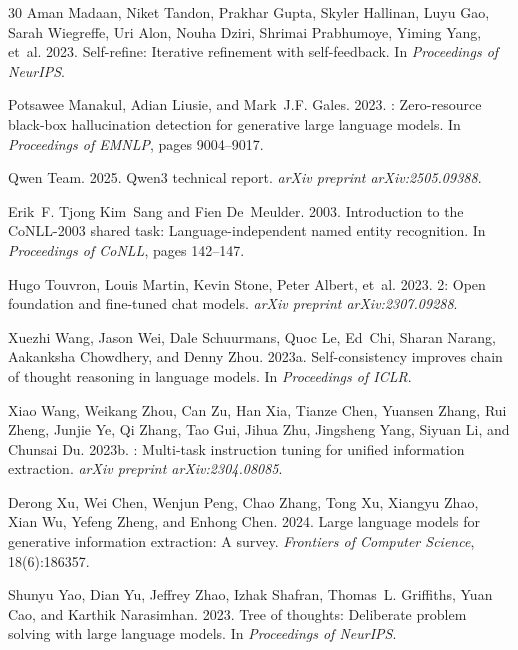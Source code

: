 \documentclass[11pt,a4paper]{article}
\begin{document}
\begin{thebibliography}{30}
Aman Madaan, Niket Tandon, Prakhar Gupta, Skyler Hallinan, Luyu Gao, Sarah Wiegreffe, Uri Alon, Nouha Dziri, Shrimai Prabhumoye, Yiming Yang, et~al. 2023.
\newblock Self-refine: Iterative refinement with self-feedback.
\newblock In \emph{Proceedings of NeurIPS}.

Potsawee Manakul, Adian Liusie, and Mark~J.F. Gales. 2023.
: Zero-resource black-box hallucination detection for generative large language models.
\newblock In \emph{Proceedings of EMNLP}, pages 9004--9017.

Qwen Team. 2025.
\newblock Qwen3 technical report.
\newblock \emph{arXiv preprint arXiv:2505.09388}.

Erik~F. Tjong Kim~Sang and Fien De~Meulder. 2003.
\newblock Introduction to the {CoNLL}-2003 shared task: Language-independent named entity recognition.
\newblock In \emph{Proceedings of CoNLL}, pages 142--147.

Hugo Touvron, Louis Martin, Kevin Stone, Peter Albert, et~al. 2023.
 2: Open foundation and fine-tuned chat models.
\newblock \emph{arXiv preprint arXiv:2307.09288}.

Xuezhi Wang, Jason Wei, Dale Schuurmans, Quoc Le, Ed~Chi, Sharan Narang, Aakanksha Chowdhery, and Denny Zhou. 2023a.
\newblock Self-consistency improves chain of thought reasoning in language models.
\newblock In \emph{Proceedings of ICLR}.

Xiao Wang, Weikang Zhou, Can Zu, Han Xia, Tianze Chen, Yuansen Zhang, Rui Zheng, Junjie Ye, Qi Zhang, Tao Gui, Jihua Zhu, Jingsheng Yang, Siyuan Li, and Chunsai Du. 2023b.
: Multi-task instruction tuning for unified information extraction.
\newblock \emph{arXiv preprint arXiv:2304.08085}.

Derong Xu, Wei Chen, Wenjun Peng, Chao Zhang, Tong Xu, Xiangyu Zhao, Xian Wu, Yefeng Zheng, and Enhong Chen. 2024.
\newblock Large language models for generative information extraction: A survey.
\newblock \emph{Frontiers of Computer Science}, 18(6):186357.

Shunyu Yao, Dian Yu, Jeffrey Zhao, Izhak Shafran, Thomas~L. Griffiths, Yuan Cao, and Karthik Narasimhan. 2023.
\newblock Tree of thoughts: Deliberate problem solving with large language models.
\newblock In \emph{Proceedings of NeurIPS}.

\end{thebibliography}
\end{document}
